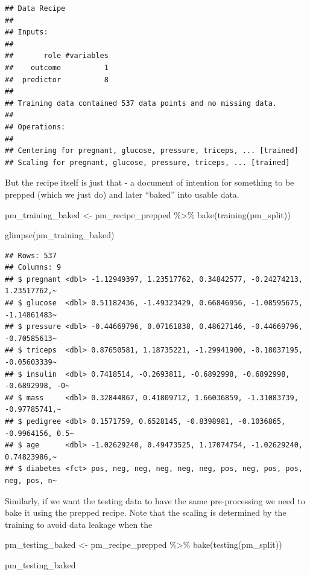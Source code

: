 \documentclass[
]{article}
\newenvironment{Shaded}{\begin{snugshade}}{\end{snugshade}}
\newcommand{\FunctionTok}[1]{\textcolor[rgb]{0.00,0.00,0.00}{#1}}
\newcommand{\NormalTok}[1]{#1}
\newcommand{\OtherTok}[1]{\textcolor[rgb]{0.56,0.35,0.01}{#1}}
\newcommand{\SpecialCharTok}[1]{\textcolor[rgb]{0.00,0.00,0.00}{#1}}
\begin{document}
\begin{verbatim}
## Data Recipe
## 
## Inputs:
## 
##       role #variables
##    outcome          1
##  predictor          8
## 
## Training data contained 537 data points and no missing data.
## 
## Operations:
## 
## Centering for pregnant, glucose, pressure, triceps, ... [trained]
## Scaling for pregnant, glucose, pressure, triceps, ... [trained]
\end{verbatim}

But the recipe itself is just that - a document of intention for
something to be prepped (which we just do) and later ``baked'' into
usable data.

\begin{Shaded}
\begin{Highlighting}[]
\NormalTok{pm\_training\_baked }\OtherTok{\textless{}{-}}\NormalTok{ pm\_recipe\_prepped }\SpecialCharTok{\%\textgreater{}\%}
  \FunctionTok{bake}\NormalTok{(}\FunctionTok{training}\NormalTok{(pm\_split)) }

\FunctionTok{glimpse}\NormalTok{(pm\_training\_baked)}
\end{Highlighting}
\end{Shaded}

\begin{verbatim}
## Rows: 537
## Columns: 9
## $ pregnant <dbl> -1.12949397, 1.23517762, 0.34842577, -0.24274213, 1.23517762,~
## $ glucose  <dbl> 0.51182436, -1.49323429, 0.66846956, -1.08595675, -1.14861483~
## $ pressure <dbl> -0.44669796, 0.07161838, 0.48627146, -0.44669796, -0.70585613~
## $ triceps  <dbl> 0.87650581, 1.18735221, -1.29941900, -0.18037195, -0.05603339~
## $ insulin  <dbl> 0.7418514, -0.2693811, -0.6892998, -0.6892998, -0.6892998, -0~
## $ mass     <dbl> 0.32844867, 0.41809712, 1.66036859, -1.31083739, -0.97785741,~
## $ pedigree <dbl> 0.1571759, 0.6528145, -0.8398981, -0.1036865, -0.9964156, 0.5~
## $ age      <dbl> -1.02629240, 0.49473525, 1.17074754, -1.02629240, 0.74823986,~
## $ diabetes <fct> pos, neg, neg, neg, neg, neg, pos, neg, pos, pos, neg, pos, n~
\end{verbatim}

Similarly, if we want the testing data to have the same pre-processing
we need to bake it using the prepped recipe. Note that the scaling is
determined by the training to avoid data leakage when the

\begin{Shaded}
\begin{Highlighting}[]
\NormalTok{pm\_testing\_baked }\OtherTok{\textless{}{-}}\NormalTok{ pm\_recipe\_prepped }\SpecialCharTok{\%\textgreater{}\%}
  \FunctionTok{bake}\NormalTok{(}\FunctionTok{testing}\NormalTok{(pm\_split)) }

\NormalTok{pm\_testing\_baked}
\end{Highlighting}
\end{Shaded}
\end{document}
